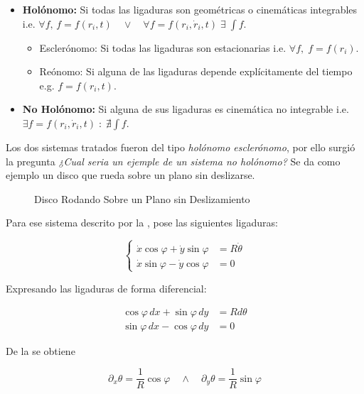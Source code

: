 \documentclass{article}
\theoremstyle{definition}
\begin{document}
\begin{itemize}
	\item \textbf{Holónomo:} Si todas las ligaduras son geométricas o cinemáticas integrables i.e. $\forall f, \, f = f(r_i, t) \quad \lor \quad \forall f = f(r_i, \dot{r}_i, t) \; \exists \; \int f$.
		\begin{itemize}
			\item Esclerónomo: Si todas las ligaduras son estacionarias i.e. $\forall f, \; f = f(r_i)$.
			\item Reónomo: Si alguna de las ligaduras depende explícitamente del tiempo e.g. $f = f(r_i, t)$.
		\end{itemize}
	\item \textbf{No Holónomo:} Si alguna de sus ligaduras es cinemática no integrable i.e. $\exists f = f(r_i, \dot{r}_i, t) \; : \; \nexists \int f$.
\end{itemize}

Los dos sistemas tratados fueron del tipo \emph{holónomo esclerónomo}, por ello surgió la pregunta \emph{¿Cual seria un ejemple de un sistema no holónomo?} Se da como ejemplo un disco que rueda sobre un plano sin deslizarse.

\begin{figure}[htbp!]
	\caption{Disco Rodando Sobre un Plano sin Deslizamiento}
	\label{fig:disk_rolling}
\end{figure}

Para ese sistema descrito por la , pose las siguientes ligaduras:

\begin{equation}
	\begin{cases}
		\dot{x}\cos{\varphi} + \dot{y}\sin{\varphi} &= R\dot{\theta} \\
		\dot{x}\sin{\varphi} - \dot{y}\cos{\varphi} &= 0
	\end{cases}
\end{equation}

Expresando las ligaduras de forma diferencial:

\begin{align}
	\cos{\varphi} \, dx + \sin{\varphi} \, dy &= R d\theta \label{eq:dexact_theta}\\
	\sin{\varphi} \, dx - \cos{\varphi} \, dy &= 0 \label{eq:constrained_2}
\end{align}

De la  se obtiene

\begin{equation}
	\partial_x \theta = \frac{1}{R} \cos{\varphi} \quad \land \quad \partial_y \theta = \frac{1}{R} \sin{\varphi}
\end{equation}
\end{document}
